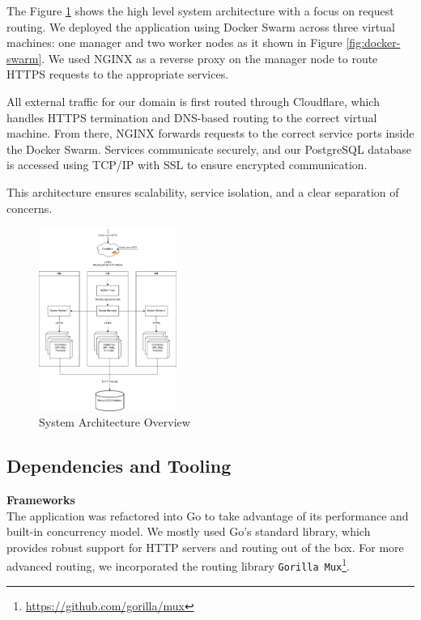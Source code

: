 The Figure \ref{fig:arch-overview} shows the high level system architecture with a focus on request routing. We deployed the application using Docker Swarm across three virtual machines: one manager and two worker nodes as it shown in Figure \ref{fig:docker-swarm}. We used NGINX as a reverse proxy on the manager node to route HTTPS requests to the appropriate services.

All external traffic for our domain is first routed through Cloudflare, which handles HTTPS termination and DNS-based routing to the correct virtual machine. From there, NGINX forwards requests to the correct service ports inside the Docker Swarm. Services communicate securely, and our PostgreSQL database is accessed using TCP/IP with SSL to ensure encrypted communication.

This architecture ensures scalability, service isolation, and a clear separation of concerns.
\begin{figure}[H]
  \centering
  \includegraphics[width=0.4\textwidth]{images/arch-overview.png}
  \caption{System Architecture Overview}
  \label{fig:arch-overview}
\end{figure}


\subsection{Dependencies and Tooling}
\textbf{Frameworks}
\\
The application was refactored into Go to take advantage of its performance and built-in concurrency model. We mostly used Go’s standard library, which provides robust support for HTTP servers and routing out of the box. For more advanced routing, we incorporated the routing library \texttt{Gorilla Mux}\footnote{\url{https://github.com/gorilla/mux}}.
\\

